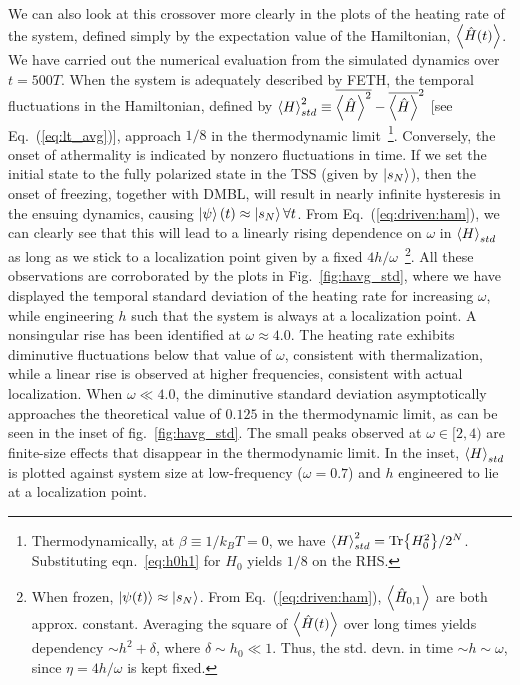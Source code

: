 \documentclass[%
reprint,
superscriptaddress,
amsmath,amssymb,
aps,
prb,
showkeys,
]{revtex4-2}
\begin{document}
We can also look at this crossover more clearly in the plots of the heating rate of the system, defined simply by the expectation value of the Hamiltonian, $\expval{\hat{H}(t)}$. We have carried out the numerical evaluation from the simulated dynamics over $t=500 T$. When the system is adequately described by FETH, the temporal fluctuations in the {Hamiltonian}, defined by $\expval{H}^2_{std}\equiv \overline{\expval{\hat{H}}^2}-\overline{\expval{\hat{H}}}^2$ [see Eq.~(\ref{eq:lt_avg})], approach $1/8$ in the thermodynamic limit~\footnote{Thermodynamically, at $\beta\equiv 1/k_BT=0$, we have $\expval{H}^2_{std}=\Tr{H^2_0}/2^N$. Substituting eqn.~\ref{eq:h0h1} for $H_0$ yields $1/8$ on the RHS.}. Conversely, the onset of athermality is indicated by nonzero fluctuations in time. If we set the initial state to the fully polarized state in the TSS (given by $\ket{s_N}$), then the 
onset of freezing, together with DMBL, will result in nearly infinite hysteresis in the ensuing dynamics, causing $\ket{\psi}(t)\approx \ket{s_N} \forall t$. From Eq.~(\ref{eq:driven:ham}), we can clearly see that this will lead to a linearly rising dependence on $\omega$ in $\expval{H}_{std}$ as long as we stick to a localization point given by a fixed $4h/\omega$~\footnote{When frozen, $\ket{\psi(t)}\approx \ket{s_N}$. From Eq.~(\ref{eq:driven:ham}), $\expval{\hat{H}_{0,1}}$ are both approx. constant. Averaging the square of $\expval{\hat{H}(t)}$ over long times yields dependency  $\sim h^2 + \delta$, where $\delta\sim h_0\ll 1$. Thus, the std. devn. in time $\sim h\sim \omega$, since $\eta=4h/\omega$ is kept fixed.}. All these observations are corroborated by the plots in Fig.~\ref{fig:havg_std}, where we have displayed the temporal standard deviation of the heating rate for increasing $\omega$, while engineering $h$ such that the system is always at a localization point. A nonsingular rise has been identified at $\omega \approx 4.0$. The heating rate exhibits diminutive fluctuations below that value of $\omega$, consistent with thermalization, while a linear rise is observed at higher frequencies, consistent with actual localization. When $\omega \ll 4.0$, the diminutive standard deviation asymptotically approaches the theoretical value of $0.125$ in the thermodynamic limit, as can be seen in the inset of fig.~\ref{fig:havg_std}. The small peaks observed at $\omega\in [2, 4)$ are finite-size effects that disappear in the thermodynamic limit. In the inset, $\expval{H}_{std}$ is plotted against system size at low-frequency ($\omega=0.7$) and $h$ engineered to lie at a localization point.
\end{document}
